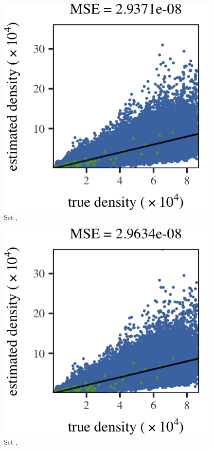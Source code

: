 \subfigvspace
\begin{subfigure}{0.3\textwidth}
	\centering
	\includegraphics[keepaspectratio=true, width=\textwidth, height=0.23\textheight]{result/img/results_baakman_4_60000_mbe_silverman}
	\caption{Set \baakmanFour, \mbe}
	\label{fig:results:singlesphere:mbe:baakman4}
\end{subfigure}	
\begin{subfigure}{0.3\textwidth}
	\centering
	\includegraphics[keepaspectratio=true, width=\textwidth, height=0.23\textheight]{result/img/results_baakman_4_60000_sambe_silverman}
	\caption{Set \baakmanFour, \sambe}
	\label{fig:results:singlesphere:sambe:baakman4}
\end{subfigure}		

